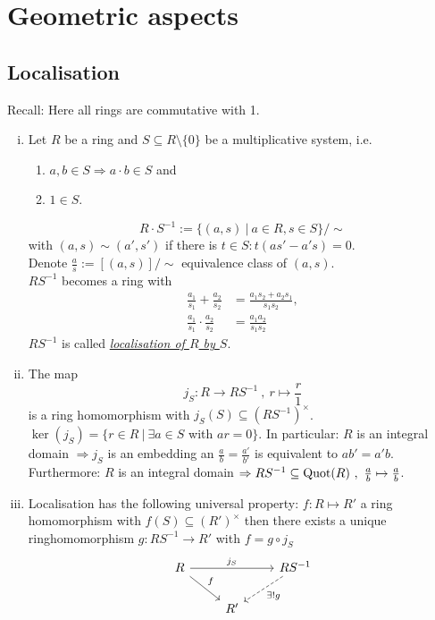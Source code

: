 
\chapter{Geometric aspects}
\section{Localisation}
Recall: Here all rings are commutative with 1.

\begin{remin}
\begin{enumerate}[(i)]
\item Let $R$ be a ring and $S \subseteq R \setminus \{0\}$ be a multiplicative system, i.e.
\begin{enumerate}[(1)]
\item $a,b \in S \Rightarrow a\cdot b \in S$ and
\item $1 \in S$.
\end{enumerate}
\[R\cdot S^{-1}:=\{(a,s) \ | \ a \in R, s \in S\}/\sim\]
with $(a,s) \sim (a',s')$ if there is $t \in S: t(as'-a's)=0$.\\
Denote $\frac{a}{s} := [(a,s)]/\sim$ equivalence class of $(a,s)$.\\
$RS^{-1}$ becomes a ring with
\begin{align*}
\frac{a_1}{s_1} + \frac{a_2}{s_2} &= \frac{a_1 s_2 + a_2 s_1}{s_1 s_2},\\
\frac{a_1}{s_1} \cdot \frac{a_2}{s_2} &= \frac{a_1 a_2 }{s_1 s_2}
\end{align*}
$RS^{-1}$ is called \emph{\underline{localisation of $R$ by $S$}}.
\item The map
\[j_S: R \to RS^{-1} \ , \ r \mapsto \frac{r}{1}\]
is a ring homomorphism with $j_S(S) \subseteq (RS^{-1})^\times$. $\ker(j_S)=\{r \in R \ | \ \exists a \in S$ with $ar=0\}$. In particular: $R$ is an integral domain $\Rightarrow j_S$ is an embedding an $\frac{a}{b}=\frac{a'}{b'}$ is equivalent to $ab'=a'b$.\\
Furthermore: $R$ is an integral domain $\Rightarrow RS^{-1} \subseteq \operatorname{Quot}(R) \ , \ \frac{a}{b} \mapsto \frac{a}{b}$.
\item Localisation has the following universal property: $f: R \mapsto R'$ a ring homomorphism with $f(S) \subseteq (R')^\times$ then there exists a unique ringhomomorphism $g: RS^{-1} \to R'$ with $f=g \circ j_S$
\[
\begin{tikzcd}
R \arrow[rd, "f"] \arrow[rr, "j_S"] && RS^{-1} \arrow[ld, dashed, "\exists ! g"]\\
&R'&
\end{tikzcd}
\]
\end{enumerate}
\end{remin}



